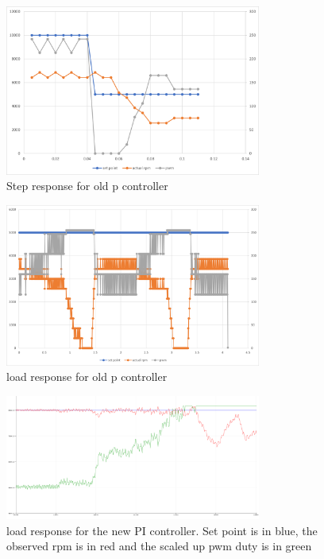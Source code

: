 \documentclass{article}
\begin{document}
\begin{figure}[H]
    \centering
    \includegraphics[width=0.75\textwidth]{Project2SpeedController/step_response2.png}
    \caption{Step response for old p controller}
    \label{fig:oldStepResponse}
\end{figure}

\begin{figure}[H]
    \centering
    \includegraphics[width=0.75\textwidth]{Project2SpeedController/load_response.png}
    \caption{load response for old p controller}
    \label{fig:oldLoadResponse}
\end{figure}

\begin{figure}[H]
    \centering
    \includegraphics[width=0.75\textwidth]{Project3ControllerStateMachine/load_response.png}
    \caption{load response for the new PI controller. Set point is in blue, the observed rpm is in red and the scaled up pwm duty is in green}
    \label{fig:LoadResponse}
\end{figure}
\end{document}
